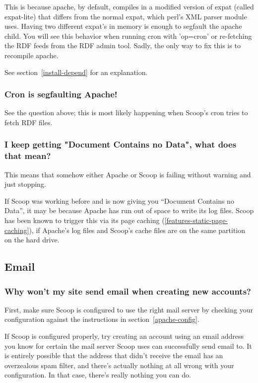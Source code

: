This is because apache, by default, compiles in a modified version of expat (called expat-lite) that differs from the normal expat, which perl's XML parser module uses. Having two different expat's in memory is enough to segfault the apache child. You will see this behavior when running cron with 'op=cron' or re-fetching the RDF feeds from the RDF admin tool. Sadly, the only way to fix this is to recompile apache.

See section~\ref{install-depend} for an explanation.

\subsubsection{Cron is segfaulting Apache!}

See the question above; this is most likely happening when Scoop's cron tries to fetch RDF files.

\subsubsection{I keep getting "Document Contains no Data", what does that mean?}

This means that somehow either Apache or Scoop is failing without warning and just stopping. 

If Scoop was working before and is now giving you ``Document Contains no Data'', it may be because Apache has run out of space to write its log files. Scoop has been known to trigger this via its page caching (\ref{features-static-page-caching}), if Apache's log files and Scoop's cache files are on the same partition on the hard drive.

\subsection{Email}

\subsubsection{Why won't my site send email when creating new accounts?}

First, make sure Scoop is configured to use the right mail server by checking your configuration against the instructions in section~\ref{apache-config}.

If Scoop is configured properly, try creating an account using an email address you know for certain the mail server Scoop uses can successfully send email to. It is entirely possible that the address that didn't receive the email has an overzealous spam filter, and there's actually nothing at all wrong with your configuration. In that case, there's really nothing you can do.

